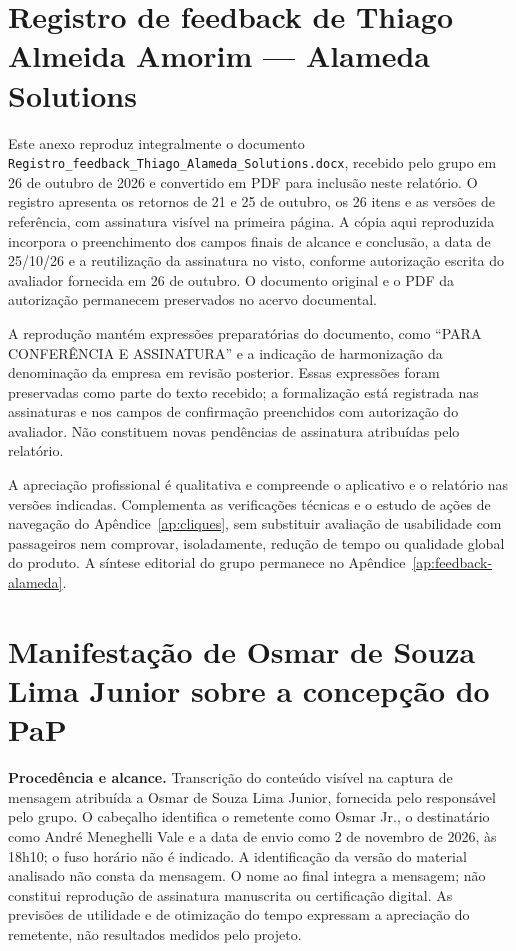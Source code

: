 \documentclass[12pt,oneside,a4paper,brazil,chapter=TITLE]{abntex2}
\begin{document}
\begin{anexosenv}
\chapter{Registro de feedback de Thiago Almeida Amorim — Alameda Solutions}\label{an:parecer-thiago}
Este anexo reproduz integralmente o documento \nolinkurl{Registro_feedback_Thiago_Alameda_Solutions.docx}, recebido pelo grupo em 26 de outubro de 2026 e convertido em PDF para inclusão neste relatório. O registro apresenta os retornos de 21 e 25 de outubro, os 26 itens e as versões de referência, com assinatura visível na primeira página. A cópia aqui reproduzida incorpora o preenchimento dos campos finais de alcance e conclusão, a data de 25/10/26 e a reutilização da assinatura no visto, conforme autorização escrita do avaliador fornecida em 26 de outubro. O documento original e o PDF da autorização permanecem preservados no acervo documental.

A reprodução mantém expressões preparatórias do documento, como “PARA CONFERÊNCIA E ASSINATURA” e a indicação de harmonização da denominação da empresa em revisão posterior. Essas expressões foram preservadas como parte do texto recebido; a formalização está registrada nas assinaturas e nos campos de confirmação preenchidos com autorização do avaliador. Não constituem novas pendências de assinatura atribuídas pelo relatório.

A apreciação profissional é qualitativa e compreende o aplicativo e o relatório nas versões indicadas. Complementa as verificações técnicas e o estudo de ações de navegação do Apêndice~\ref{ap:cliques}, sem substituir avaliação de usabilidade com passageiros nem comprovar, isoladamente, redução de tempo ou qualidade global do produto. A síntese editorial do grupo permanece no Apêndice~\ref{ap:feedback-alameda}.

\chapter{Manifestação de Osmar de Souza Lima Junior sobre a concepção do PaP}\label{an:manifestacao-osmar}
\begingroup\SingleSpacing
\noindent\textbf{Procedência e alcance.} Transcrição do conteúdo visível na captura de mensagem atribuída a Osmar de Souza Lima Junior, fornecida pelo responsável pelo grupo. O cabeçalho identifica o remetente como Osmar Jr., o destinatário como André Meneghelli Vale e a data de envio como 2 de novembro de 2026, às 18h10; o fuso horário não é indicado. A identificação da versão do material analisado não consta da mensagem. O nome ao final integra a mensagem; não constitui reprodução de assinatura manuscrita ou certificação digital. As previsões de utilidade e de otimização do tempo expressam a apreciação do remetente, não resultados medidos pelo projeto.


\end{anexosenv}
\end{document}
